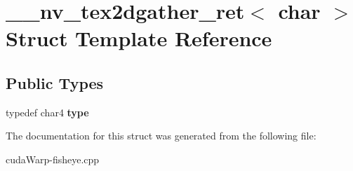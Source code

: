 \hypertarget{struct____nv__tex2dgather__ret_3_01char_01_4}{}\section{\+\_\+\+\_\+nv\+\_\+tex2dgather\+\_\+ret$<$ char $>$ Struct Template Reference}
\label{struct____nv__tex2dgather__ret_3_01char_01_4}
\subsection*{Public Types}
\begin{DoxyCompactItemize}
\item 
typedef char4 {\bfseries type}\hypertarget{struct____nv__tex2dgather__ret_3_01char_01_4_a03ba0095b3209826a7a1fc318483f869}{}\label{struct____nv__tex2dgather__ret_3_01char_01_4_a03ba0095b3209826a7a1fc318483f869}

\end{DoxyCompactItemize}


The documentation for this struct was generated from the following file\+:\begin{DoxyCompactItemize}
\item 
cuda\+Warp-\/fisheye.\+cpp\end{DoxyCompactItemize}
